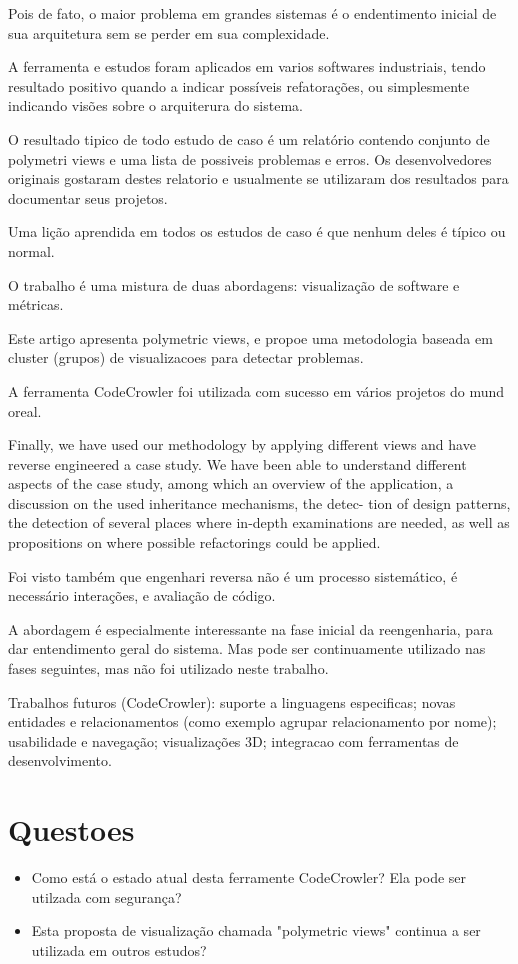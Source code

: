 \documentclass[12pt]{article}
\begin{document}
Pois de fato, o maior problema em grandes sistemas é o endentimento inicial de sua arquitetura sem se perder em sua complexidade.

A ferramenta e estudos foram aplicados em varios softwares industriais, tendo resultado positivo quando a indicar possíveis refatorações, ou simplesmente indicando visões sobre o arquiterura do sistema.

O resultado tipico de todo estudo de caso é um relatório contendo conjunto de polymetri views e uma lista de possiveis problemas e erros. Os desenvolvedores originais gostaram destes relatorio e usualmente se utilizaram dos resultados para documentar seus projetos.

Uma lição aprendida em todos os estudos de caso é que nenhum deles é típico ou normal.

O trabalho é uma mistura de duas abordagens: visualização de software e métricas.

Este artigo apresenta polymetric views, e propoe uma metodologia baseada em cluster (grupos) de visualizacoes para detectar problemas.

A ferramenta CodeCrowler foi utilizada com sucesso em vários projetos do mund oreal.

Finally, we have used our methodology by applying
different views and have reverse engineered a case study.
We have been able to understand different aspects of the
case study, among which an overview of the application, a
discussion on the used inheritance mechanisms, the detec-
tion of design patterns, the detection of several places where
in-depth examinations are needed, as well as propositions
on where possible refactorings could be applied.

Foi visto também que engenhari reversa não é um processo sistemático, é necessário interações, e avaliação de código.

A abordagem é especialmente interessante na fase inicial da reengenharia, para dar entendimento geral do sistema. Mas pode ser continuamente utilizado nas fases seguintes, mas não foi utilizado neste trabalho.

Trabalhos futuros (CodeCrowler): suporte a linguagens especificas; novas entidades e relacionamentos (como exemplo agrupar relacionamento por nome); usabilidade e navegação; visualizações 3D; integracao com ferramentas de desenvolvimento.


\section{Questoes}

\begin{itemize}
  \item Como está o estado atual desta ferramente CodeCrowler? Ela pode ser utilzada com segurança?
  \item Esta proposta de visualização chamada "polymetric views" continua a ser utilizada em outros estudos?
\end{itemize}


\end{document}
